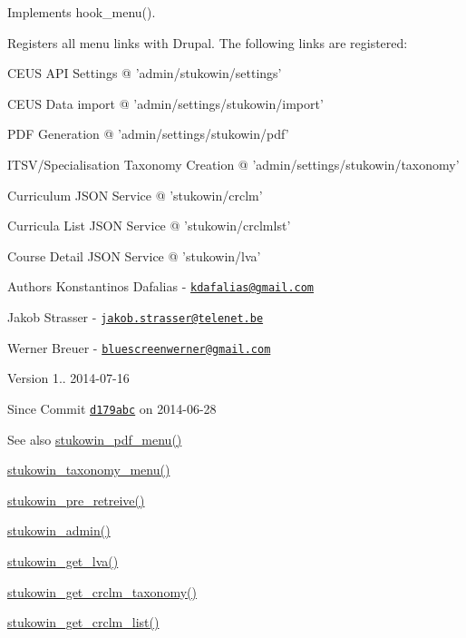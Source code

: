 Implements hook\+\_\+menu(). 

Registers all menu links with Drupal. The following links are registered\+:
\begin{DoxyItemize}
\item C\+E\+U\+S A\+P\+I Settings @ 'admin/stukowin/settings'
\item C\+E\+U\+S Data import @ 'admin/settings/stukowin/import'
\item P\+D\+F Generation @ 'admin/settings/stukowin/pdf'
\item I\+T\+S\+V/\+Specialisation Taxonomy Creation @ 'admin/settings/stukowin/taxonomy'
\item Curriculum J\+S\+O\+N Service @ 'stukowin/crclm'
\item Curricula List J\+S\+O\+N Service @ 'stukowin/crclmlst'
\item Course Detail J\+S\+O\+N Service @ 'stukowin/lva'
\end{DoxyItemize}

\begin{DoxyAuthor}{Authors}
Konstantinos Dafalias -\/ \href{mailto:kdafalias@gmail.com}{\tt kdafalias@gmail.\+com} 

Jakob Strasser -\/ \href{mailto:jakob.strasser@telenet.be}{\tt jakob.\+strasser@telenet.\+be} 

Werner Breuer -\/ \href{mailto:bluescreenwerner@gmail.com}{\tt bluescreenwerner@gmail.\+com} 
\end{DoxyAuthor}
\begin{DoxyVersion}{Version}
1.. 2014-\/07-\/16 
\end{DoxyVersion}
\begin{DoxySince}{Since}
Commit \href{http://github.com/TheJake123/DrupalModul/commit/d179abcc5e05743086cd67cf1ce30b08923a7183}{\tt d179abc} on 2014-\/06-\/28
\end{DoxySince}
\begin{DoxySeeAlso}{See also}
\hyperlink{group___drupal2_p_d_f_ga3649714a54a489d8c0096116fd9cb367}{stukowin\+\_\+pdf\+\_\+menu()} 

\hyperlink{group___drupal2_i_t_s_v_gab706d935ca9d9998c5e25a9ad6486d6a}{stukowin\+\_\+taxonomy\+\_\+menu()} 

\hyperlink{group___c_e_u_s2_drupal_ga481789ce9904fc10aefb8eaf7534133b}{stukowin\+\_\+pre\+\_\+retreive()} 

\hyperlink{group___stukowin___module_ga55d453d5b6f8ae4e643308d8814e67a5}{stukowin\+\_\+admin()} 

\hyperlink{group___drupal2_a_g_g_ga7522e206f1a87971b916a7a0be0098c6}{stukowin\+\_\+get\+\_\+lva()} 

\hyperlink{group___drupal2_a_g_g_gaf137f10bef98707dacaf33d6581773d0}{stukowin\+\_\+get\+\_\+crclm\+\_\+taxonomy()} 

\hyperlink{group___drupal2_a_g_g_gad0cb4d7faa68097f5b7df8311e36b22e}{stukowin\+\_\+get\+\_\+crclm\+\_\+list()} 
\end{DoxySeeAlso}


